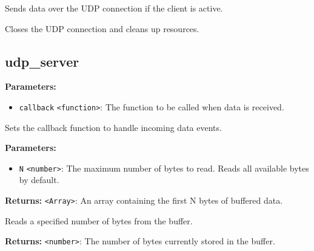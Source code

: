 \documentclass[12pt,a4paper]{article}
\begin{document}
\noindent Sends data over the UDP connection if the client is active.

\vspace{5mm}
\noindent {}


\noindent Closes the UDP connection and cleans up resources.


\subsection{udp\_server}
\vspace{5mm}
\noindent {}


\noindent \textbf{Parameters:}
\begin{itemize}
  \item \texttt{callback} \texttt{<function>}: The function to be called when data is received.
\end{itemize}

\noindent Sets the callback function to handle incoming data events.

\vspace{5mm}
\noindent {}


\noindent \textbf{Parameters:}
\begin{itemize}
  \item \texttt{N} \texttt{<number>}: The maximum number of bytes to read. Reads all available bytes by default.
\end{itemize}

\noindent \textbf{Returns:} \texttt{<Array>}: An array containing the first N bytes of buffered data.

\noindent Reads a specified number of bytes from the buffer.

\vspace{5mm}
\noindent {}


\noindent \textbf{Returns:} \texttt{<number>}: The number of bytes currently stored in the buffer.
\end{document}
